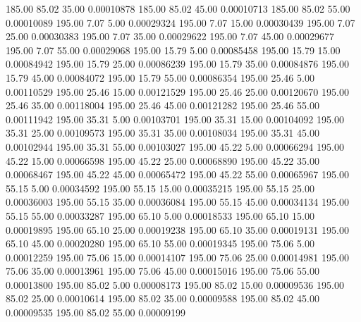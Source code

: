     185.00     85.02     35.00     0.00010878
    185.00     85.02     45.00     0.00010713
    185.00     85.02     55.00     0.00010089
    195.00      7.07      5.00     0.00029324
    195.00      7.07     15.00     0.00030439
    195.00      7.07     25.00     0.00030383
    195.00      7.07     35.00     0.00029622
    195.00      7.07     45.00     0.00029677
    195.00      7.07     55.00     0.00029068
    195.00     15.79      5.00     0.00085458
    195.00     15.79     15.00     0.00084942
    195.00     15.79     25.00     0.00086239
    195.00     15.79     35.00     0.00084876
    195.00     15.79     45.00     0.00084072
    195.00     15.79     55.00     0.00086354
    195.00     25.46      5.00     0.00110529
    195.00     25.46     15.00     0.00121529
    195.00     25.46     25.00     0.00120670
    195.00     25.46     35.00     0.00118004
    195.00     25.46     45.00     0.00121282
    195.00     25.46     55.00     0.00111942
    195.00     35.31      5.00     0.00103701
    195.00     35.31     15.00     0.00104092
    195.00     35.31     25.00     0.00109573
    195.00     35.31     35.00     0.00108034
    195.00     35.31     45.00     0.00102944
    195.00     35.31     55.00     0.00103027
    195.00     45.22      5.00     0.00066294
    195.00     45.22     15.00     0.00066598
    195.00     45.22     25.00     0.00068890
    195.00     45.22     35.00     0.00068467
    195.00     45.22     45.00     0.00065472
    195.00     45.22     55.00     0.00065967
    195.00     55.15      5.00     0.00034592
    195.00     55.15     15.00     0.00035215
    195.00     55.15     25.00     0.00036003
    195.00     55.15     35.00     0.00036084
    195.00     55.15     45.00     0.00034134
    195.00     55.15     55.00     0.00033287
    195.00     65.10      5.00     0.00018533
    195.00     65.10     15.00     0.00019895
    195.00     65.10     25.00     0.00019238
    195.00     65.10     35.00     0.00019131
    195.00     65.10     45.00     0.00020280
    195.00     65.10     55.00     0.00019345
    195.00     75.06      5.00     0.00012259
    195.00     75.06     15.00     0.00014107
    195.00     75.06     25.00     0.00014981
    195.00     75.06     35.00     0.00013961
    195.00     75.06     45.00     0.00015016
    195.00     75.06     55.00     0.00013800
    195.00     85.02      5.00     0.00008173
    195.00     85.02     15.00     0.00009536
    195.00     85.02     25.00     0.00010614
    195.00     85.02     35.00     0.00009588
    195.00     85.02     45.00     0.00009535
    195.00     85.02     55.00     0.00009199
